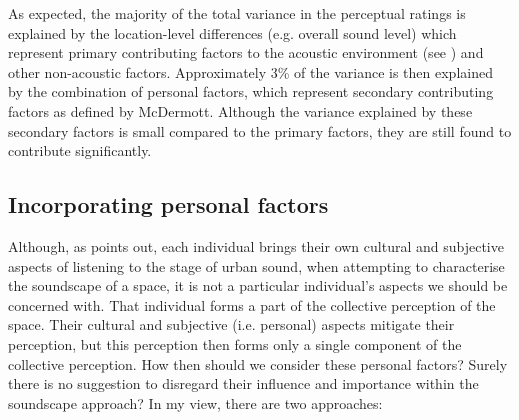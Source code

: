 As expected, the majority of the total variance in the perceptual ratings is explained by the location-level differences (e.g. overall sound level) which represent primary contributing factors to the acoustic environment (see \citep{McDermott2012Auditory}) and other non-acoustic factors. Approximately 3\% of the variance is then explained by the combination of personal factors, which represent secondary contributing factors as defined by McDermott. Although the variance explained by these secondary factors is small compared to the primary factors, they are still found to contribute significantly. %



\subsection{Incorporating personal factors}
Although, as \citet{Droumeva2021sound} points out, each individual brings their own cultural and subjective aspects of listening to the stage of urban sound, when attempting to characterise the soundscape of a space, it is not a particular individual's aspects we should be concerned with. That individual forms a part of the collective perception of the space. Their cultural and subjective (i.e. personal) aspects mitigate their perception, but this perception then forms only a single component of the collective perception. How then should we consider these personal factors? Surely there is no suggestion to disregard their influence and importance within the soundscape approach? In my view, there are two approaches:

